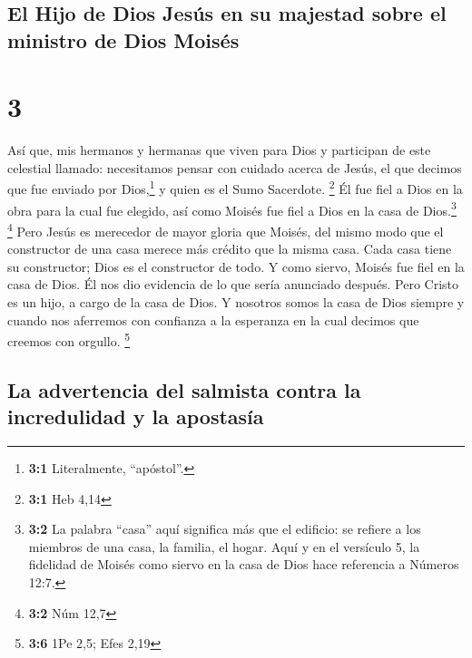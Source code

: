 \hypertarget{el-hijo-de-dios-jesuxfas-en-su-majestad-sobre-el-ministro-de-dios-moisuxe9s}{%
\subsection{El Hijo de Dios Jesús en su majestad sobre el ministro de
Dios
Moisés}\label{el-hijo-de-dios-jesuxfas-en-su-majestad-sobre-el-ministro-de-dios-moisuxe9s}}

\hypertarget{section-2}{%
\section{3}\label{section-2}}

 Así que, mis hermanos y hermanas que viven para Dios y
participan de este celestial llamado: necesitamos pensar con cuidado
acerca de Jesús, el que decimos que fue enviado por Dios,\footnote{\textbf{3:1}
  Literalmente, ``apóstol''.} y quien es el Sumo Sacerdote. \footnote{\textbf{3:1}
  Heb 4,14}  Él fue fiel a Dios en la obra para la cual
fue elegido, así como Moisés fue fiel a Dios en la casa de
Dios.\footnote{\textbf{3:2} La palabra ``casa'' aquí significa más que
  el edificio: se refiere a los miembros de una casa, la familia, el
  hogar. Aquí y en el versículo 5, la fidelidad de Moisés como siervo en
  la casa de Dios hace referencia a Números 12:7.} \footnote{\textbf{3:2}
  Núm 12,7}  Pero Jesús es merecedor de mayor gloria que
Moisés, del mismo modo que el constructor de una casa merece más crédito
que la misma casa.  Cada casa tiene su constructor; Dios
es el constructor de todo.  Y como siervo, Moisés fue fiel
en la casa de Dios. Él nos dio evidencia de lo que sería anunciado
después.  Pero Cristo es un hijo, a cargo de la casa de
Dios. Y nosotros somos la casa de Dios siempre y cuando nos aferremos
con confianza a la esperanza en la cual decimos que creemos con orgullo.
\footnote{\textbf{3:6} 1Pe 2,5; Efes 2,19}

\hypertarget{la-advertencia-del-salmista-contra-la-incredulidad-y-la-apostasuxeda}{%
\subsection{La advertencia del salmista contra la incredulidad y la
apostasía}\label{la-advertencia-del-salmista-contra-la-incredulidad-y-la-apostasuxeda}}

